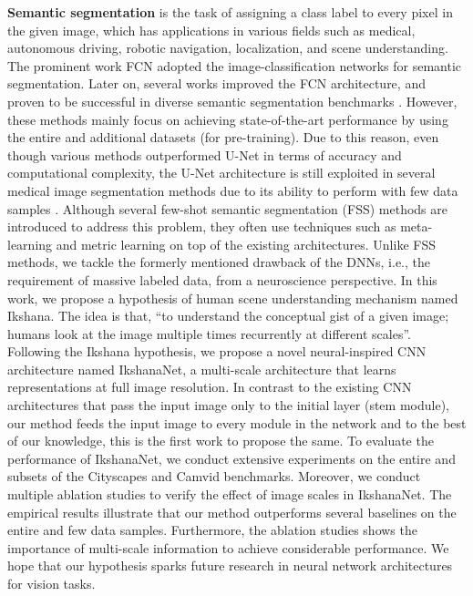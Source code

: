 \documentclass{article}
\begin{document}
\textbf{Semantic segmentation} is the task of assigning a class label to every pixel in the given image, which has applications in various fields such as medical, autonomous driving, robotic navigation, localization, and scene understanding. The prominent work FCN \cite{long2015fully} adopted the image-classification networks \cite{krizhevsky25hinton,simonyan2014very,7298594} for semantic segmentation. Later on, several works \cite{ronneberger2015u,badrinarayanan2017segnet,zhao2017pyramid,chen2018encoder,SunXLW19,10.1007/978-3-030-58539-6_11,takikawa2019gated,yuan2020segfix} improved the FCN \cite{long2015fully} architecture, and proven to be successful in diverse semantic segmentation benchmarks \cite{BrostowSFC:ECCV08,cordts2016cityscapes,8100027}. However, these methods mainly focus on achieving state-of-the-art performance by using the entire and additional datasets \cite{deng2009imagenet} (for pre-training). Due to this reason,
even though various methods \cite{chen2018encoder,SunXLW19} outperformed U-Net \cite{ronneberger2015u} in terms of accuracy and computational complexity, the U-Net \cite{ronneberger2015u} architecture is still exploited in several medical image segmentation methods due to its ability to perform with few data samples \cite{siddique2020u}.
Although 
several few-shot semantic segmentation (FSS) methods are introduced to address this problem, they often use techniques such as meta-learning \cite{xu2016deep,dong2018few,RakellySDEL18,2009-06680,TianWQWSG20} and metric learning \cite{BMVC2017_167,9108530,Wang_2019_ICCV,Zhang_2019_CVPR,WangZHYCZ20,WangZHYCZ20,Zhang_2019_ICCV,YangLLJY20} on top of the existing  architectures. \newline
Unlike FSS methods, we tackle the formerly mentioned drawback of the DNNs, i.e., the requirement of massive labeled data, from a neuroscience perspective. In this work, we propose a hypothesis of human scene understanding mechanism named Ikshana. The idea is that, ``to understand the conceptual gist of a given image; humans look at the image multiple times recurrently at different scales''. Following the Ikshana hypothesis, we propose a novel neural-inspired CNN architecture named IkshanaNet, a multi-scale architecture that learns representations at full image resolution. 
In contrast to the existing CNN architectures that pass the input image only to the initial layer (stem module), our method feeds the input image to every module in the network and to the best of our knowledge, this is the first work to propose the same.\newline
To evaluate the performance of IkshanaNet,  we conduct extensive experiments on the entire and subsets of the Cityscapes and Camvid benchmarks. Moreover, we conduct multiple ablation studies to verify the effect of image scales in IkshanaNet.
The empirical results illustrate that our method outperforms several baselines on the entire and few data samples. Furthermore, the ablation studies shows the importance of multi-scale information to achieve considerable performance.
We hope that our hypothesis sparks future research in neural network architectures for vision tasks.
\end{document}
